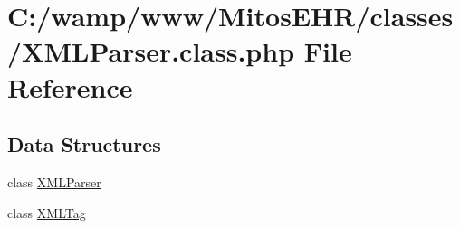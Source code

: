 \hypertarget{_x_m_l_parser_8class_8php}{\section{\-C\-:/wamp/www/\-Mitos\-E\-H\-R/classes/\-X\-M\-L\-Parser.class.\-php \-File \-Reference}
\label{_x_m_l_parser_8class_8php}
}
\subsection*{\-Data \-Structures}
\begin{DoxyCompactItemize}
\item 
class \hyperlink{class_x_m_l_parser}{\-X\-M\-L\-Parser}
\item 
class \hyperlink{class_x_m_l_tag}{\-X\-M\-L\-Tag}
\end{DoxyCompactItemize}
